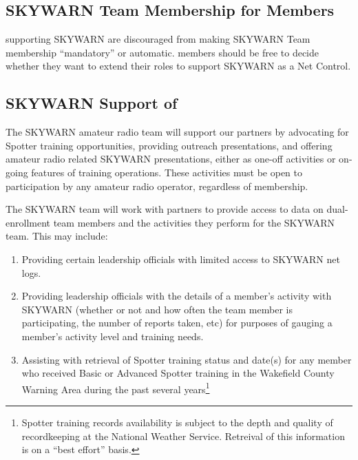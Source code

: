 \documentclass[pdflatex,letterpaper,twoside,12pt]{book}
\begin{document}

\subsection{SKYWARN Team Membership for \tpteam Members}

\tpteams supporting SKYWARN are discouraged from making SKYWARN Team membership ``mandatory'' or automatic.  \tpteam members should be free to decide whether they want to extend their roles to support SKYWARN as a Net Control.


\subsection{SKYWARN Support of \tpteams}

The SKYWARN amateur radio team will support our \tpteam partners by advocating for Spotter training opportunities, providing outreach presentations, and offering amateur radio related SKYWARN presentations, either as one-off activities or on-going features of \tpteam training operations.  These activities must be open to participation by any amateur radio operator, regardless of \tpteam membership.

The SKYWARN team will work with \tpteam partners to provide access to data on dual-enrollment team members and the activities they perform for the SKYWARN team.  This may include:

\begin{enumerate}
\item Providing certain \tpteam leadership officials with limited access to SKYWARN net logs.
\item Providing \tpteam leadership officials with the details of a member's activity with SKYWARN (whether or not and how often the team member is participating, the number of reports taken, etc) for purposes of gauging a member's activity level and training needs.
\item Assisting with retrieval of Spotter training status and date(s) for any \tpteam member who received Basic or Advanced Spotter training in the Wakefield County Warning Area during the past several years\footnote{Spotter training records availability is subject to the depth and quality of recordkeeping at the National Weather Service. Retreival of this information is on a ``best effort'' basis.}
\end{enumerate}
\end{document}
